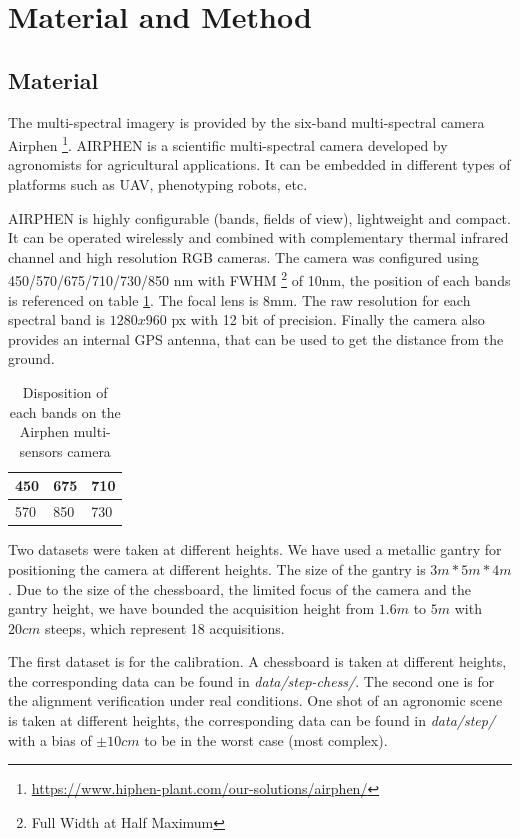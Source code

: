 \documentclass[]{elsarticle}
\begin{document}
	\newpage
	\section{Material and Method}
	
	\subsection{Material}
	
	The multi-spectral imagery is provided by the six-band multi-spectral camera Airphen \footnote{\url{https://www.hiphen-plant.com/our-solutions/airphen/}}.
	AIRPHEN is a scientific multi-spectral camera developed by agronomists for agricultural applications.
	It can be embedded in different types of platforms such as UAV, phenotyping robots, etc.
	\\
	\par AIRPHEN is highly configurable (bands, fields of view), lightweight and compact.
	It can be operated wirelessly and combined with complementary thermal infrared channel and high resolution RGB cameras.
	The camera was configured using 450/570/675/710/730/850 nm with FWHM \footnote{Full Width at Half Maximum} of 10nm, the position of each bands is referenced on table \ref{tab:bands-disposition}.
	The focal lens is 8mm. The raw resolution for each spectral band is $1280x960$ px with 12 bit of precision.
	Finally the camera also provides an internal GPS antenna, that can be used to get the distance from the ground.
	
	\begin{table}[H]
		\begin{tabularx}{\linewidth}{|X|X|X|}
			\hline
			450 & 675 & 710 \\
			\hline
			570 & 850 & 730 \\
			\hline
		\end{tabularx}
		\label{tab:bands-disposition}
		\caption{Disposition of each bands on the Airphen multi-sensors camera}
	\end{table}
	
	\par Two datasets were taken at different heights.
	We have used a metallic gantry for positioning the camera at different heights.
	The size of the gantry is $3m * 5m * 4m$.
	Due to the size of the chessboard, the limited focus of the camera and the gantry height,
	we have bounded the acquisition height from $1.6m$ to $5m$ with $20cm$ steeps, which represent 18 acquisitions.
	\\
	\par The first dataset is for the calibration. A chessboard is taken at different heights, the corresponding data can be found in \textit{data/step-chess/}.
	The second one is for the alignment verification under real conditions.
	One shot of an agronomic scene is taken at different heights, the corresponding data can be found in \textit{data/step/}
	with a bias of $\pm 10cm$ to be in the worst case (most complex).
	
\end{document}
